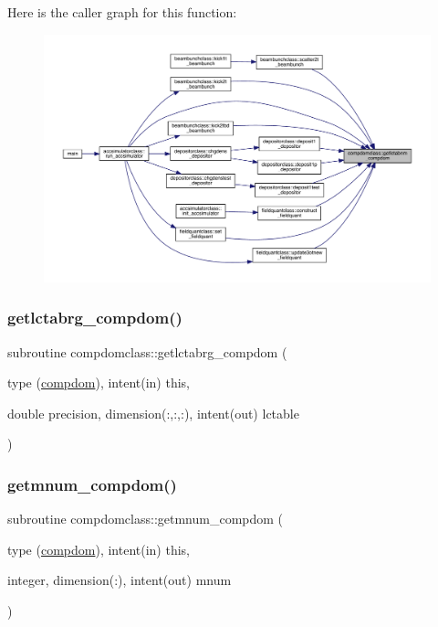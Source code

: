 Here is the caller graph for this function\+:\nopagebreak
\begin{figure}[H]
\begin{center}
\leavevmode
\includegraphics[width=350pt]{namespacecompdomclass_a7c7c1450a459bb1753ef8230ab0d7651_icgraph}
\end{center}
\end{figure}
\mbox{\label{namespacecompdomclass_ab679e7ac8218e1580f1a45a53d1fe9f1}} 
\subsubsection{\texorpdfstring{getlctabrg\_compdom()}{getlctabrg\_compdom()}}
{\footnotesize\ttfamily subroutine compdomclass\+::getlctabrg\+\_\+compdom (\begin{DoxyParamCaption}\item[{type (\mbox{\hyperlink{namespacecompdomclass_structcompdomclass_1_1compdom}{compdom}}), intent(in)}]{this,  }\item[{double precision, dimension(\+:,\+:,\+:), intent(out)}]{lctable }\end{DoxyParamCaption})}

\mbox{\label{namespacecompdomclass_a4742fe5698151e1e31e2261798a433c8}} 
\subsubsection{\texorpdfstring{getmnum\_compdom()}{getmnum\_compdom()}}
{\footnotesize\ttfamily subroutine compdomclass\+::getmnum\+\_\+compdom (\begin{DoxyParamCaption}\item[{type (\mbox{\hyperlink{namespacecompdomclass_structcompdomclass_1_1compdom}{compdom}}), intent(in)}]{this,  }\item[{integer, dimension(\+:), intent(out)}]{mnum }\end{DoxyParamCaption})}

